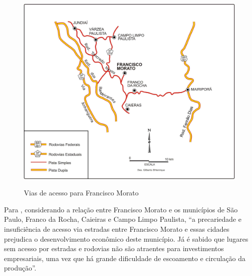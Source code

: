 	\begin{figure}[!htb]
		\centering
		\caption{Vias de acesso para Francisco Morato}
		\includegraphics[width=\linewidth]{img/cassiele_vias_acesso}
		\label{fig:vias_acesso}
	\end{figure}
	
	Para , considerando a relação entre Francisco Morato e os municípios de São Paulo, Franco da Rocha, Caieiras e Campo	Limpo Paulista, ``a precariedade e insuficiência de acesso via estradas entre Francisco Morato e essas cidades prejudica o desenvolvimento econômico deste município. Já é sabido que lugares sem acesso por estradas e rodovias não são atraentes para investimentos empresariais, uma vez que há grande dificuldade de escoamento e circulação da produção''.
    
%
%

	\postextual
	
	
	
	
	\renewcommand{\glossaryname}{Glossário}
	\renewcommand*{\glsseeformat}[3][\seename]{\textit{#1}
		\glsseelist{#2}}
	
